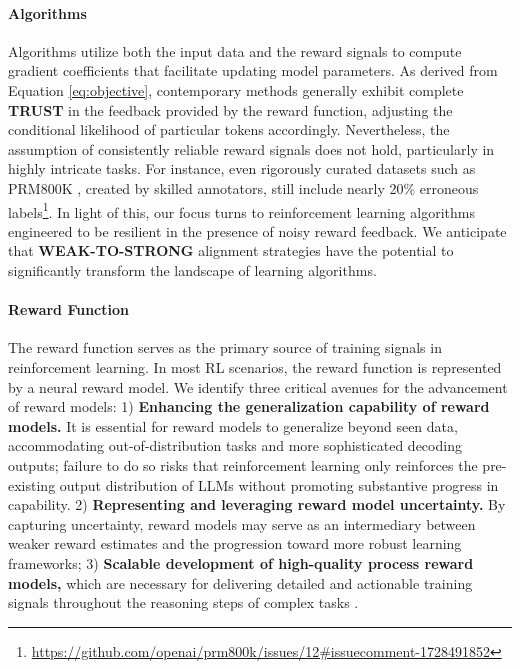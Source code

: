 \begin{itemize}[topsep=0pt]
\begin{itemize}[topsep=0pt]
\paragraph{Algorithms} Algorithms utilize both the input data and the reward signals to compute gradient coefficients that facilitate updating model parameters. As derived from Equation \ref{eq:objective}, contemporary methods generally exhibit complete \textbf{TRUST} in the feedback provided by the reward function, adjusting the conditional likelihood of particular tokens accordingly. Nevertheless, the assumption of consistently reliable reward signals does not hold, particularly in highly intricate tasks. For instance, even rigorously curated datasets such as PRM800K \citep{lightman2023let}, created by skilled annotators, still include nearly 20\% erroneous labels\footnote{\url{https://github.com/openai/prm800k/issues/12\#issuecomment-1728491852}}. In light of this, our focus turns to reinforcement learning algorithms engineered to be resilient in the presence of noisy reward feedback. We anticipate that \textbf{WEAK-TO-STRONG} alignment strategies \citep{burns2023weak} have the potential to significantly transform the landscape of learning algorithms.

\paragraph{Reward Function} The reward function serves as the primary source of training signals in reinforcement learning. In most RL scenarios, the reward function is represented by a neural reward model. We identify three critical avenues for the advancement of reward models: 1) \textbf{Enhancing the generalization capability of reward models.} It is essential for reward models to generalize beyond seen data, accommodating out-of-distribution tasks and more sophisticated decoding outputs; failure to do so risks that reinforcement learning only reinforces the pre-existing output distribution of LLMs without promoting substantive progress in capability. 2) \textbf{Representing and leveraging reward model uncertainty.} By capturing uncertainty, reward models may serve as an intermediary between weaker reward estimates and the progression toward more robust learning frameworks; 3) \textbf{Scalable development of high-quality process reward models,} which are necessary for delivering detailed and actionable training signals throughout the reasoning steps of complex tasks \citep{lightman2023let,wang2023math}.


\end{itemize}
\end{itemize}

